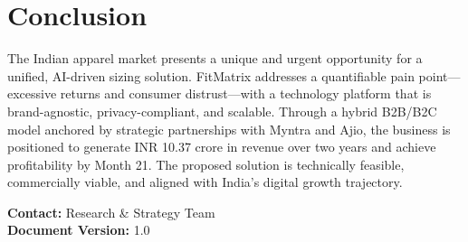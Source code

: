 \documentclass[12pt,a4paper]{article}
\begin{document}
\section{Conclusion}

The Indian apparel market presents a unique and urgent opportunity for a unified, AI-driven sizing solution. FitMatrix addresses a quantifiable pain point---excessive returns and consumer distrust---with a technology platform that is brand-agnostic, privacy-compliant, and scalable. Through a hybrid B2B/B2C model anchored by strategic partnerships with Myntra and Ajio, the business is positioned to generate INR 10.37 crore in revenue over two years and achieve profitability by Month 21. The proposed solution is technically feasible, commercially viable, and aligned with India's digital growth trajectory.

\vskip 0.5in
\noindent\textbf{Contact:} Research \& Strategy Team \\
\textbf{Document Version:} 1.0



\end{document}
